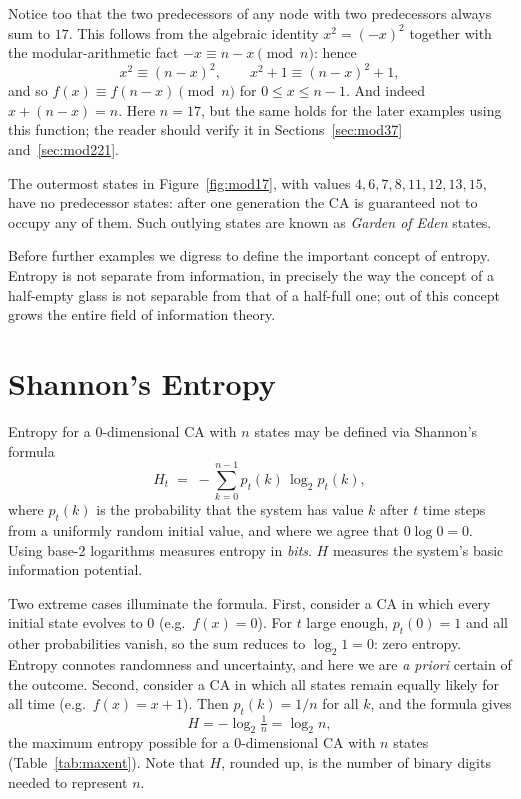 Notice too that the two predecessors of any node with two predecessors
always sum to $17$.  This follows from the algebraic identity
$x^2 = (-x)^2$ together with the modular-arithmetic fact
$-x \equiv n-x \pmod n$: hence
\[
  x^2 \equiv (n-x)^2, \qquad x^2+1 \equiv (n-x)^2+1,
\]
and so $f(x) \equiv f(n-x) \pmod n$ for $0 \le x \le n-1$.  And indeed
$x + (n-x) = n$.  Here $n=17$, but the same holds for the later
examples using this function; the reader should verify it in
Sections~\ref{sec:mod37} and~\ref{sec:mod221}.

The outermost states in Figure~\ref{fig:mod17}, with values
$4, 6, 7, 8, 11, 12, 13, 15$, have no predecessor states: after one
generation the CA is guaranteed not to occupy any of them.  Such
outlying states are known as \emph{Garden of Eden} states.

Before further examples we digress to define the important concept of
entropy.  Entropy is not separate from information, in precisely the
way the concept of a half-empty glass is not separable from that of a
half-full one; out of this concept grows the entire field of
information theory.

\section{Shannon's Entropy}
\label{sec:entropy}

Entropy for a 0-dimensional CA with $n$ states may be defined via
Shannon's formula
\begin{equation}
  H_t \;=\; -\sum_{k=0}^{n-1} p_t(k)\,\log_2 p_t(k),
\end{equation}
where $p_t(k)$ is the probability that the system has value $k$ after
$t$ time steps from a uniformly random initial value, and where we
agree that $0\log 0 = 0$.  Using base-2 logarithms measures entropy in
\emph{bits}.  $H$ measures the system's basic information potential.

Two extreme cases illuminate the formula.  First, consider a CA in
which every initial state evolves to $0$ (e.g.\ $f(x)=0$).  For $t$
large enough, $p_t(0)=1$ and all other probabilities vanish, so the sum
reduces to $\log_2 1 = 0$: zero entropy.  Entropy connotes randomness
and uncertainty, and here we are \emph{a priori} certain of the
outcome.  Second, consider a CA in which all states remain equally
likely for all time (e.g.\ $f(x)=x+1$).  Then $p_t(k)=1/n$ for all $k$,
and the formula gives
\begin{equation}
  H = -\log_2 \tfrac1n = \log_2 n,
\end{equation}
the maximum entropy possible for a 0-dimensional CA with $n$ states
(Table~\ref{tab:maxent}).  Note that $H$, rounded up, is the number of
binary digits needed to represent $n$.

